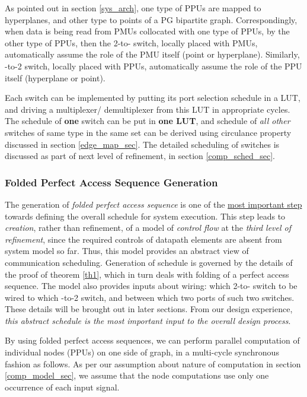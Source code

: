 \documentclass[12pt]{article}
\begin{document}
As pointed out in section \ref{sys_arch}, one type of PPUs are mapped to hyperplanes, and other type to points of a PG bipartite
graph. Correspondingly, when data is being read from PMUs
collocated with one type of PPUs, by the other type of
PPUs, then the 2-to- switch, locally placed with PMUs, automatically assume the role of the PMU itself (point or
hyperplane). Similarly, -to-2 switch, locally placed with
PPUs, automatically assume the role of the PPU
itself (hyperplane or point).

Each switch can be implemented by putting its
port selection schedule in a
LUT, and driving a multiplexer/ demultiplexer from this LUT in appropriate
cycles. The schedule of \textbf{one} switch can be put in \textbf{one LUT},
and schedule of \textit{all other} switches of same type in the same set
can be derived using circulance property discussed in section
\ref{edge_map_sec}. The detailed scheduling of switches is discussed as
part of next level of refinement, in section \ref{comp_sched_sec}.

\subsubsection{Folded Perfect Access Sequence Generation}
\label{pat_sec}
The generation of \textit{folded perfect access
sequence} is one of the
\uline{most important step} towards defining the overall schedule for
system execution. This step leads to \textit{creation}, rather
than refinement, of a model of \textit{control flow} at the \textit{third
level of refinement}, since the required controls of datapath elements are
absent from system model so far. Thus, this model provides an abstract
view of communication scheduling. Generation of schedule is governed by
the details of the proof of theorem \ref{th1}, which in turn deals
with folding of a perfect access sequence. The model also provides
inputs about wiring: which 2-to- switch to be wired to which
-to-2 switch, and between which two ports of such two switches.
These details will be brought out in later sections. From our design
experience, \textit{this abstract schedule is the most important input to the overall design
process}.

By using folded perfect access sequences, we can perform parallel
computation of individual nodes (PPUs) on one side of graph, in a multi-cycle
synchronous fashion as follows. As per our assumption about nature of
computation in section \ref{comp_model_sec}, we assume that the node computations
use only one occurrence of each input signal.
\end{document}
